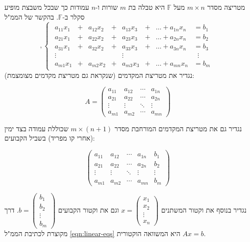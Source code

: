 \documentclass[
  hebrew,
  12pt,
  a4paper,
  oneside]{book}
\theoremstyle{definition}
\theoremstyle{remark}
\theoremstyle{plain}
\theoremstyle{remark}
\begin{document}
\begin{definition}

מטריצה מסדר \(m\times n\) מעל \(\mathbb F\) היא טבלה בת \(m\) שורות
ו-\(n\) עמודות כך שבכל משבצת מופיע סקלר ב-\(\mathbb F\). בהקשר של הממ"ל
\[,\begin{cases}
\begin{alignedat}{7}
a_{11}x_1 &{}+{}& a_{12}x_2 &{}+{}& a_{13}x_3 &{}+{}& \dots + a_{1n}x_n &= b_1 \\[4pt]
a_{21}x_1 &{}+{}& a_{22}x_2 &{}+{}& a_{23}x_3 &{}+{}& \dots + a_{2n}x_n &= b_2 \\[4pt]
a_{31}x_1 &{}+{}& a_{32}x_2 &{}+{}& a_{33}x_3 &{}+{}& \dots + a_{3n}x_n &= b_3 \\[4pt]
\vdots& & & & \vdots & & & \;\;\vdots \\[4pt]
a_{m1}x_1 &{}+{}& a_{m2}x_2 &{}+{}& a_{m3}x_3 &{}+{}& \dots + a_{mn}x_n &= b_m
\end{alignedat}
\end{cases}\] נגדיר את מטריצת המקדמים (שנקראת גם מטריצת מקדמים מצומצמת):

\[A=\begin{pmatrix}a_{11} & a_{12} & \cdots & a_{1n}\\
a_{21} & a_{22} & \cdots & a_{2n}\\
\vdots & \vdots & \ddots & \vdots\\
a_{m1} & a_{m2} & \cdots & a_{mn}
\end{pmatrix}\]

נגדיר גם את מטריצת המקדמים המורחבת מסדר \(m\times(n+1)\) שכוללת עמודה
בצד ימין (אחרי קו מפריד) בשביל הקבועים:

\[\left( \begin{array}{cccc|c}
    a_{11} & a_{12} & \cdots & a_{1n} & b_1 \\
    a_{21} & a_{22} & \cdots & a_{2n} & b_2 \\
    \vdots & \vdots & \ddots & \vdots & \vdots \\
    a_{m1} & a_{m2} & \cdots & a_{mn} & b_m
\end{array} \right)\]

נגדיר בנוסף את וקטור המשתנים \(x=\begin{pmatrix}x_1\\
x_2\\
\vdots\\
x_n
\end{pmatrix}\) וגם את וקטור הקבועים \(b=\begin{pmatrix}b_1\\
b_2\\
\vdots\\
b_m
\end{pmatrix}\). דרך מקוצרת לכתיבת הממ"ל \ref{eqn:linear-eqs} היא
המשוואה הוקטורית \(Ax=b\).

\end{definition}
\end{document}
